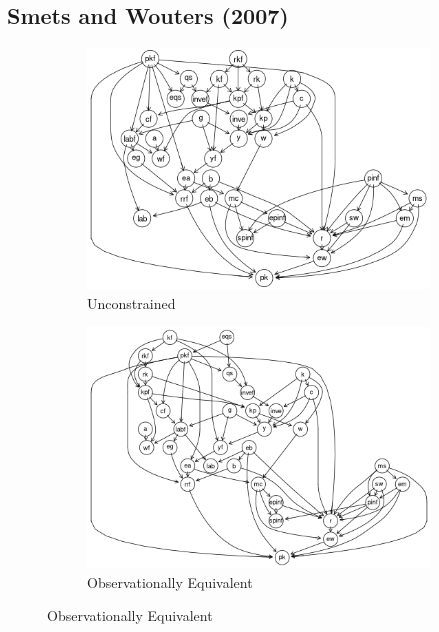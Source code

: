 \documentclass{article}
\begin{document}
\subsection{Smets and Wouters (2007)}

\begin{figure}

    \centering
    \begin{subfigure}{0.3\textwidth}
      \centering
      \includegraphics[width=\linewidth]{images/sw_init.png} 
      \caption{Unconstrained}
      \label{init}
    \end{subfigure}
    \begin{subfigure}{0.3\textwidth}
      \centering  
      \includegraphics[width=\linewidth]{images/sw_equiv.png}
      \caption{Observationally Equivalent}
      \label{equiv}
    \end{subfigure}

\end{figure}
\end{document}

